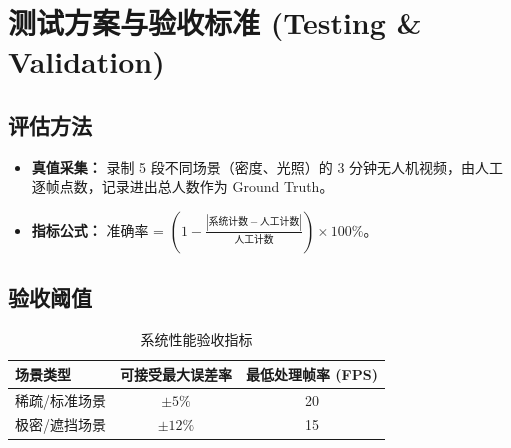 \documentclass[a4paper, 11pt, fontset=fandol]{ctexart}
\begin{document}
\section{测试方案与验收标准 (Testing \& Validation)}

\subsection{评估方法}
\begin{itemize}
    \item \textbf{真值采集：} 录制 5 段不同场景（密度、光照）的 3 分钟无人机视频，由人工逐帧点数，记录进出总人数作为 Ground Truth。
    \item \textbf{指标公式：} 准确率 = $(1 - \frac{| \text{系统计数} - \text{人工计数} |}{\text{人工计数}}) \times 100\%$。
\end{itemize}

\subsection{验收阈值}
\begin{table}[h]
    \centering
    \begin{tabular}{lcc}
        \toprule
        \textbf{场景类型} & \textbf{可接受最大误差率} & \textbf{最低处理帧率 (FPS)} \\
        \midrule
        稀疏/标准场景 & $\pm 5\%$ & 20 \\
        极密/遮挡场景 & $\pm 12\%$ & 15 \\
        \bottomrule
    \end{tabular}
    \caption{系统性能验收指标}
\end{table}
\end{document}
